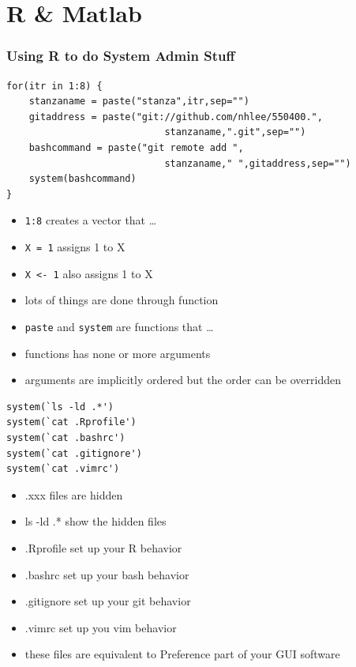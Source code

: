 \documentclass[hyperref={colorlinks=false},handout,10pt]{beamer}
\let\olditem\item
\renewcommand{\item}{\setlength{\itemsep}{0.5\baselineskip}\olditem}
\begin{document}
\section{R \& Matlab}

\begin{frame}
    \frametitle{Using R to do System Admin Stuff}
    \begin{lstlisting}
for(itr in 1:8) {
    stanzaname = paste("stanza",itr,sep="")
    gitaddress = paste("git://github.com/nhlee/550400.",
                            stanzaname,".git",sep="")
    bashcommand = paste("git remote add ",
                            stanzaname," ",gitaddress,sep="")
    system(bashcommand)
}
    \end{lstlisting}
    \begin{itemize}
        \item \texttt{1:8} creates a vector that \ldots 
        \item \texttt{X = 1} assigns 1 to X 
        \item \texttt{X <- 1} also assigns 1 to X
        \item lots of things are done through function 
        \item \texttt{paste} and \texttt{system} are functions that \ldots 
        \item functions has none or more arguments 
        \item arguments are implicitly ordered but the order can be overridden
    \end{itemize}
    \begin{lstlisting}
system(`ls -ld .*')
system(`cat .Rprofile')
system(`cat .bashrc')
system(`cat .gitignore')
system(`cat .vimrc')
    \end{lstlisting}
    \begin{itemize}
        \item .xxx files are hidden
        \item ls -ld .* show the hidden files
        \item .Rprofile set up your R behavior
        \item .bashrc set up your bash behavior
        \item .gitignore set up your git behavior 
        \item .vimrc set up you vim behavior
        \item these files are equivalent to Preference part of your GUI
            software
    \end{itemize}
\end{frame}
\end{document}

